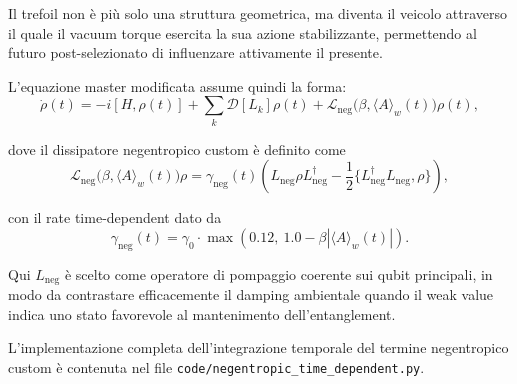 \documentclass[11pt,a4paper]{article}
\theoremstyle{plain}
\theoremstyle{definition}
\begin{document}
\vspace{0.4cm}

Il trefoil non è più solo una struttura geometrica, ma diventa il veicolo attraverso il quale il vacuum torque esercita la sua azione stabilizzante, permettendo al futuro post-selezionato di influenzare attivamente il presente.

\vspace{0.4cm}

L’equazione master modificata assume quindi la forma:
\begin{equation}
\dot{\rho}(t) = -i[H,\rho(t)] + \sum_k \mathcal{D}[L_k]\rho(t) + \mathcal{L}_{\text{neg}}\bigl(\beta, \langle A \rangle_w(t)\bigr)\rho(t),
\label{eq:master_time_dependent}
\end{equation}

\vspace{0.2cm}

dove il dissipatore negentropico custom è definito come
\begin{equation}
\mathcal{L}_{\text{neg}}\bigl(\beta, \langle A \rangle_w(t)\bigr)\rho = \gamma_{\text{neg}}(t) \left( L_{\text{neg}}\rho L_{\text{neg}}^\dagger - \frac{1}{2}\{L_{\text{neg}}^\dagger L_{\text{neg}}, \rho\} \right),
\label{eq:lneg}
\end{equation}

con il rate time-dependent dato da
\begin{equation}
\gamma_{\text{neg}}(t) = \gamma_0 \cdot \max\left(0.12,\ 1.0 - \beta \left|\langle A \rangle_w(t)\right|\right).
\label{eq:gamma_neg}
\end{equation}

\vspace{0.3cm}

Qui \(L_{\text{neg}}\) è scelto come operatore di pompaggio coerente sui qubit principali, in modo da contrastare efficacemente il damping ambientale quando il weak value indica uno stato favorevole al mantenimento dell’entanglement.

\vspace{0.4cm}


L’implementazione completa dell’integrazione temporale del termine negentropico custom è contenuta nel file  
\texttt{code/negentropic\_time\_dependent.py}.

\vspace{0.3cm}

\vspace{0.1cm}
\end{document}
